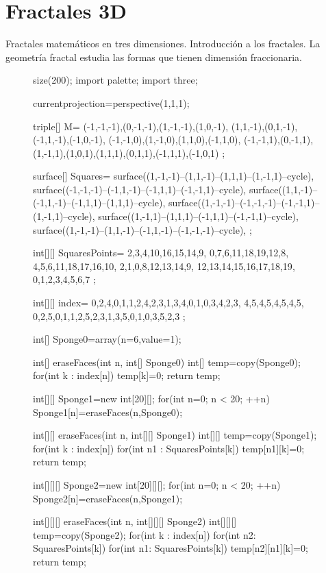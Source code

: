 \documentclass[a4paper]{book}
\begin{document}
\section{Fractales 3D}


Fractales matemáticos en tres dimensiones. Introducción a los fractales. La geometría fractal estudia las formas que tienen dimensión fraccionaria.


\begin{figure}[!ht]
	\centering
	\begin{asy}
	size(200);
	import palette;
	import three;

	currentprojection=perspective(1,1,1);

	triple[] M=
	{
	(-1,-1,-1),(0,-1,-1),(1,-1,-1),(1,0,-1),
	(1,1,-1),(0,1,-1),(-1,1,-1),(-1,0,-1),
	(-1,-1,0),(1,-1,0),(1,1,0),(-1,1,0),
	(-1,-1,1),(0,-1,1),(1,-1,1),(1,0,1),(1,1,1),(0,1,1),(-1,1,1),(-1,0,1)
	};

	surface[] Squares=
	{
	surface((1,-1,-1)--(1,1,-1)--(1,1,1)--(1,-1,1)--cycle),
	surface((-1,-1,-1)--(-1,1,-1)--(-1,1,1)--(-1,-1,1)--cycle),
	surface((1,1,-1)--(-1,1,-1)--(-1,1,1)--(1,1,1)--cycle),
	surface((1,-1,-1)--(-1,-1,-1)--(-1,-1,1)--(1,-1,1)--cycle),
	surface((1,-1,1)--(1,1,1)--(-1,1,1)--(-1,-1,1)--cycle),
	surface((1,-1,-1)--(1,1,-1)--(-1,1,-1)--(-1,-1,-1)--cycle),
	};

	int[][] SquaresPoints=
	{
	{2,3,4,10,16,15,14,9},
	{0,7,6,11,18,19,12,8},
	{4,5,6,11,18,17,16,10},
	{2,1,0,8,12,13,14,9},
	{12,13,14,15,16,17,18,19},
	{0,1,2,3,4,5,6,7}
	};

	int[][] index=
	{
	{0,2,4},{0,1},{1,2,4},{2,3},{1,3,4},{0,1},{0,3,4},{2,3},
	{4,5},{4,5},{4,5},{4,5},
	{0,2,5},{0,1},{1,2,5},{2,3},{1,3,5},{0,1},{0,3,5},{2,3}
	};

	int[] Sponge0=array(n=6,value=1);

	int[] eraseFaces(int n, int[] Sponge0) {
	int[] temp=copy(Sponge0);
	for(int k : index[n]) {
	temp[k]=0;
	}
	return temp;
	}

	int[][] Sponge1=new int[20][];
	for(int n=0; n < 20; ++n) {
	Sponge1[n]=eraseFaces(n,Sponge0);
	}

	int[][] eraseFaces(int n, int[][] Sponge1) {
	int[][] temp=copy(Sponge1);
	for(int k : index[n])
	for(int n1 : SquaresPoints[k])
	temp[n1][k]=0;
	return temp;
	}

	int[][][] Sponge2=new int[20][][];
	for(int n=0; n < 20; ++n)
	Sponge2[n]=eraseFaces(n,Sponge1);

	int[][][] eraseFaces(int n, int[][][] Sponge2) {
	int[][][] temp=copy(Sponge2);
	for(int k : index[n])
	for(int n2: SquaresPoints[k])
	for(int n1: SquaresPoints[k])
	temp[n2][n1][k]=0;
	return temp;
	}


\end{asy}
\end{figure}
\end{document}
